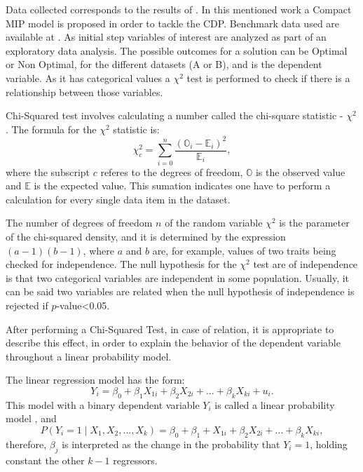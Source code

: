 \documentclass[5p,times]{elsarticle}
\begin{document}
	Data collected corresponds to the results of \citet{hernandez2020study}. In this mentioned work a Compact MIP model is proposed in order to tackle the CDP. Benchmark data used are available at  \cite{kinable2013dataset}.
	As initial step variables of interest are analyzed as part of an exploratory data analysis.
	The possible outcomes for a solution can be Optimal or Non Optimal, for the different datasets (A or B), and is the dependent variable. As it has categorical values a $ \chi^{2}$ test is performed to check if there is a relationship between those variables. 
	
	Chi-Squared test involves calculating a number called the chi-square statistic - $\chi^{2}$. The formula for the $\chi^{2}$ statistic is: \begin{equation}
		\chi_{c}^{2} =\sum_{i=0}^{n} \frac{\left( \mathbb{O}_{i} - \mathbb{E}_{i}\right) ^{2}}{\mathbb{E}_{i}}, 
	\end{equation} where the subscript $ \textit{c} $ referes to the degrees of freedom, $\mathbb{O}$ is the observed value and $\mathbb{E} $ is the expected value. This sumation indicates one have to perform a calculation for every single data item in the dataset.
	
	The number of degrees of freedom $ n $ of the random variable $\chi^{2}$ is the parameter of the chi-squared density, and it is determined by the expression $ (a-1)(b-1) $, where $a$ and $b$ are, for example, values of two traits being checked for independence. The null hypothesis for the $\chi^{2}$ test are of independence is that two categorical variables are independent in some population. Usually, it can be said two variables are related when the null hypothesis of independence is rejected if $p$-value<0.05.
	
	After performing a Chi-Squared Test, in case of relation, it is appropriate to describe this effect, in order to explain the behavior of the dependent variable throughout a linear probability model. 
	
	The linear regression model has the form: \begin{equation}
		Y_{i} = \beta_{0} + \beta_{1}X_{1i} + \beta_{2}X_{2i} + ... + \beta_{k}X_{ki} + u_{i}.
	\end{equation} This model with a binary dependent variable $Y_{i}$ is called a linear probability model \cite{hanck2019introduction}, and \begin{equation}
		P(Y_{i} = 1 \mid X_{1},X_{2},...,X_{k} ) = \beta_{0} + \beta_{1} + X_{1i} + \beta_{2}X_{2i} + ... + \beta_{k}X_{ki},
	\end{equation} therefore, $ \beta_{j} $ is interpreted as the change in the probability that $ Y_{i} = 1 $, holding constant the other $ k -1$ regressors.
	
\end{document}

